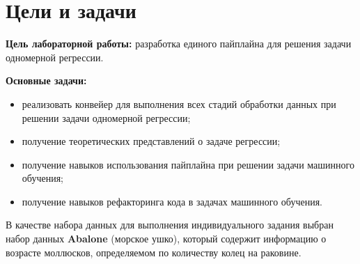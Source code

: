 \chapter*{Цели и задачи}
\label{ch:intro_lab6}

\textbf{Цель лабораторной работы:} разработка единого пайплайна для решения задачи одномерной регрессии.

\textbf{Основные задачи:}
\begin{itemize}
    \item реализовать конвейер для выполнения всех стадий обработки данных при решении задачи одномерной регрессии;
    \item получение теоретических представлений о задаче регрессии;
    \item получение навыков использования пайплайна при решении задачи машинного обучения;
    \item получение навыков рефакторинга кода в задачах машинного обучения.
\end{itemize}

В качестве набора данных для выполнения индивидуального задания выбран набор данных \textbf{Abalone} (морское ушко), который содержит информацию о возрасте моллюсков, определяемом по количеству колец на раковине.

\endinput